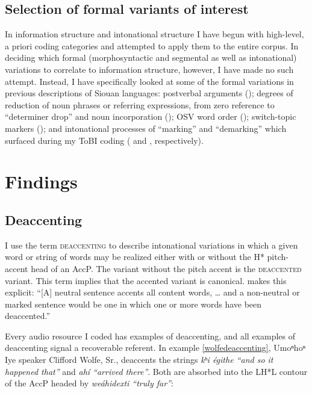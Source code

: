 \documentclass[output=paper]{LSP/langsci}
\begin{document}
\subsection{Selection of formal variants of interest}\label{variantselection}

In information structure and intonational structure I have begun with high-level, a priori coding categories and attempted to apply them to the entire corpus. In deciding which formal (morphosyntactic and segmental as well as intonational) variations to correlate to information structure, however, I have made no such attempt. Instead, I have specifically looked at some of the formal variations in previous descriptions of Siouan languages: postverbal arguments (); degrees of reduction of noun phrases or referring expressions, from zero reference to “determiner drop” and noun incorporation (); OSV word order (); switch-topic markers (); and intonational processes of “marking” and “demarking” which surfaced during my ToBI coding ( and , respectively).

\section{Findings}\label{findings}

\subsection{Deaccenting}\label{deaccenting}

	I use the term \textsc{deaccenting} to describe intonational variations in which a given word or string of words may be realized either with or without the H* pitch-accent head of an AccP. The variant without the pitch accent is the \textsc{deaccented} variant. This term implies that the accented variant is canonical. \citet[100]{Bolinger1986} makes this explicit: “[A] neutral sentence accents all content words, … and a non-neutral or marked sentence would be one in which one or more words have been deaccented.”
	
Every audio resource I coded has examples of deaccenting, and all examples of deaccenting signal a recoverable referent. In example \ref{wolfedeaccenting}, Umoⁿhoⁿ Iye speaker Clifford Wolfe, Sr., deaccents the strings \textit{kʰi égithe “and so it happened that”} and \textit{ahí “arrived there”}. Both are absorbed into the LH*L contour of the AccP headed by \textit{weáhidexti “truly far”}:
\end{document}
